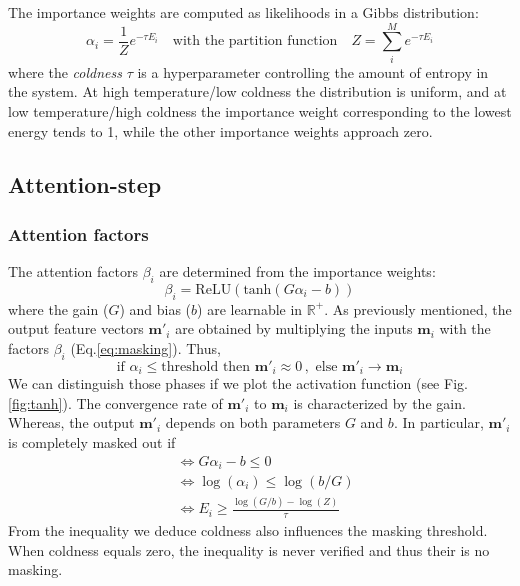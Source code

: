 \documentclass[12pt]{report}
\begin{document}
\indent The importance weights are computed as likelihoods in a Gibbs distribution:
\begin{equation}
\alpha_i = \frac{1}{Z}e^{-\tau E_i} \quad \text{with the partition function} \quad Z = \sum_i^M e^{-\tau E_i} 
\label{eq:ising-model}
\end{equation}
where the \textit{coldness} $\tau$ is a hyperparameter controlling the amount of entropy in the system. At high temperature/low coldness the distribution is uniform, and at low temperature/high coldness the importance weight corresponding to the lowest energy tends to 1, while the other importance weights approach zero.

\subsection{Attention-step}
\subsubsection*{Attention factors}
The attention factors $\beta_i$ are determined from the importance weights:  
\begin{equation}
\beta_i = \text{ReLU}(\text{tanh}(G\alpha_i - b))
\end{equation}
where the gain ($G$) and bias ($b$) are learnable in $\mathbb{R}^+$. As previously mentioned, the output feature vectors $\mathbf{m}'_i$ are obtained by multiplying the inputs $\mathbf{m}_i$ with the factors $\beta_i$ (Eq.\ref{eq:masking}). Thus,
\begin{equation}
\text{if}\,\, \alpha_i \leq \text{threshold then}\,\, \textbf{m}'_i \approx 0 \, , \,\, \text{else}\,\, \textbf{m}'_i \rightarrow \textbf{m}_i
\end{equation}
We can distinguish those phases if we plot the activation function (see Fig.\ref{fig:tanh}). The convergence rate of $\textbf{m}'_i$ to $\textbf{m}_i$ is characterized by the gain. Whereas, the output $\textbf{m}'_i$ depends on both parameters $G$ and $b$. In particular, $\textbf{m}'_i$ is completely masked out if
\begin{equation}
\begin{split}
&\Leftrightarrow G\alpha_i - b \leq 0 \\
&\Leftrightarrow\log(\alpha_i) \leq \log(b/G)\\
&\Leftrightarrow E_i \geq \frac{\log(G/b) - \log(Z)}{\tau} 
\end{split}
\end{equation}
From the inequality we deduce coldness also influences the masking threshold. When coldness equals zero, the inequality is never verified and thus their is no masking.
\end{document}
